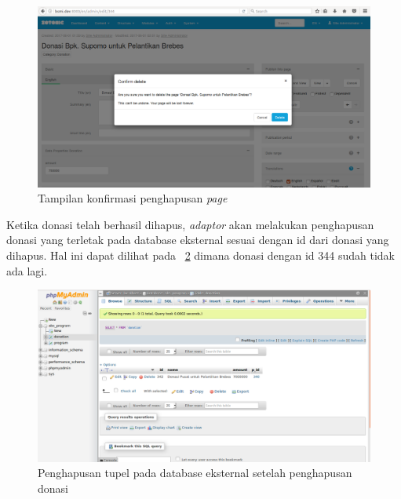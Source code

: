 \begin{figure}
	\centering
	\includegraphics[width=1\textwidth]
	{pics/23-deleteDonation.png}
	\caption{Tampilan konfirmasi penghapusan \textit{page}}
	\label{fig:deletedonation2}
\end{figure}
\vspace{-0.3cm}

Ketika donasi telah berhasil dihapus, \textit{adaptor} akan melakukan penghapusan donasi yang terletak pada database eksternal sesuai dengan id dari donasi yang dihapus. Hal ini dapat dilihat pada \pic~\ref{fig:dbdelete} dimana donasi dengan id 344 sudah tidak ada lagi.
\begin{figure}
	\centering
	\includegraphics[width=1\textwidth]
	{pics/25-dbdelete.png}
	\caption{Penghapusan tupel pada database eksternal setelah penghapusan donasi}
	\label{fig:dbdelete}
\end{figure}
\vspace{-0.3cm}

